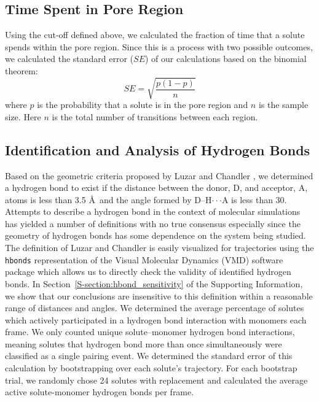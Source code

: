 \documentclass[journal=jpcbfk,manuscript=article]{achemso}
\begin{document}
  \subsection{Time Spent in Pore Region}
  
  Using the cut-off defined above, we calculated the fraction of time
  that a solute spends within the pore region. Since this is a process
  with two possible outcomes, we calculated the standard error ($SE$) of our
  calculations based on the binomial theorem: 
  \begin{equation}
  SE = \sqrt{\dfrac{p(1-p)}{n}}
  \end{equation}
  where $p$ is the probability that a solute is in the pore region and
  $n$ is the sample size. Here $n$ is the total number of transitions
  between each region. 
  
  \subsection{Identification and Analysis of Hydrogen Bonds}\label{method:hbonds}  %

  Based on the geometric criteria proposed by Luzar and Chandler 
  \cite{luzar_effect_1996}, we determined a hydrogen bond to exist if the
  distance between the donor, D, and acceptor, A, atoms is less than 
  3.5 \AA~and the angle formed by D--H$\cdot\cdot\cdot$A is less than 30\degree. Attempts
  to describe a hydrogen bond in the context of molecular simulations has
  yielded a number of definitions with no true consensus 
  \cite{prada-gracia_quest_2013} especially since the geometry of hydrogen
  bonds has some dependence on the system being studied. The definition of
  Luzar and Chandler is easily visualized for trajectories using the 
  \texttt{hbonds} representation of the Visual Molecular Dynamics (VMD) software 
  package which allows us to directly check the validity of identified hydrogen bonds.
  In Section~\ref{S-section:hbond_sensitivity} of the Supporting Information, we
  show that our conclusions are insensitive to this definition within a 
  reasonable range
  of distances and angles.
  We determined the average percentage of solutes which actively participated
  in a hydrogen bond interaction with monomers each frame. We only counted
  unique solute--monomer hydrogen bond interactions, meaning solutes
  that hydrogen bond more than once simultaneously were classified as a
  single pairing event. We determined the standard error of this calculation
  by bootstrapping over each solute's trajectory. For each bootstrap trial,
  we randomly chose 24 solutes with replacement and calculated the average
  active solute-monomer hydrogen bonds per frame.
\end{document}

